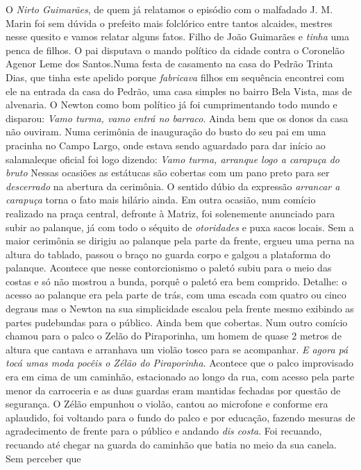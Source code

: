 \documentclass[12pt,brazil,]{book}
\begin{document}
O \emph{Nirto Guimarães}, de quem já relatamos o episódio com o
malfadado J. M. Marin foi sem dúvida o prefeito mais folclórico entre
tantos alcaides, mestres nesse quesito e vamos relatar alguns fatos.
Filho de João Guimarães e \emph{tinha} uma penca de filhos. O pai
disputava o mando político da cidade contra o Coronelão Agenor Leme dos
Santos.Numa festa de casamento na casa do Pedrão Trinta Dias, que tinha
este apelido porque \emph{fabricava} filhos em sequência encontrei com
ele na entrada da casa do Pedrão, uma casa simples no bairro Bela Vista,
mas de alvenaria. O Newton como bom político já foi cumprimentando todo
mundo e disparou: \emph{Vamo turma, vamo entrá no barraco}. Ainda bem
que os donos da casa não ouviram. Numa cerimônia de inauguração do busto
do seu pai em uma pracinha no Campo Largo, onde estava sendo aguardado
para dar início ao salamaleque oficial foi logo dizendo: \emph{Vamo
turma, arranque logo a carapuça do bruto} Nessas ocasiões as estátucas
são cobertas com um pano preto para ser \emph{descerrado} na abertura da
cerimônia. O sentido dúbio da expressão \emph{arrancar a carapuça} torna
o fato mais hilário ainda. Em outra ocasião, num comício realizado na
praça central, defronte à Matriz, foi solenemente anunciado para subir
ao palanque, já com todo o séquito de \emph{otoridades} e puxa sacos
locais. Sem a maior cerimônia se dirigiu ao palanque pela parte da
frente, ergueu uma perna na altura do tablado, passou o braço no guarda
corpo e galgou a plataforma do palanque. Acontece que nesse
contorcionismo o paletó subiu para o meio das costas e só não mostrou a
bunda, porquê o paletó era bem comprido. Detalhe: o acesso ao palanque
era pela parte de trás, com uma escada com quatro ou cinco degraus mas o
Newton na sua simplicidade escalou pela frente mesmo exibindo as partes
pudebundas para o público. Ainda bem que cobertas. Num outro comício
chamou para o palco o Zelão do Piraporinha, um homem de quase 2 metros
de altura que cantava e arranhava um violão tosco para se acompanhar.
\emph{E agora pá tocá umas moda pocêis o Zélão do Piraporinha}. Acontece
que o palco improvisado era em cima de um caminhão, estacionado ao longo
da rua, com acesso pela parte menor da carroceria e as duas guardas eram
mantidas fechadas por questão de segurança. O Zélão empunhou o violão,
cantou ao microfone e conforme era aplaudido, foi voltando para o fundo
do palco e por educação, fazendo mesuras de agradecimento de frente para
o público e andando \emph{dis costa}. Foi recuando, recuando até chegar
na guarda do caminhão que batia no meio da sua canela. Sem perceber que
\end{document}
